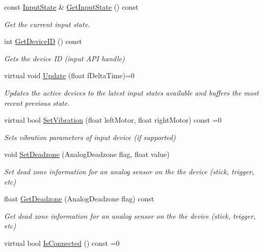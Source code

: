 \begin{DoxyCompactItemize}
const \hyperlink{struct_blade_1_1_input_state}{Input\+State} \& \hyperlink{class_blade_1_1_input_device_a0c652079b55274cf661ecf2657f65967}{Get\+Input\+State} () const
\begin{DoxyCompactList}\small\item\em Get the current input state. \end{DoxyCompactList}\item 
int \hyperlink{class_blade_1_1_input_device_af05aace5ac1decaa1bf64bfefbcf013b}{Get\+Device\+ID} () const
\begin{DoxyCompactList}\small\item\em Gets the device ID (input A\+PI handle) \end{DoxyCompactList}\item 
virtual void \hyperlink{class_blade_1_1_input_device_a6c0b653604f7c2a4840116c9e893b3e5}{Update} (float f\+Delta\+Time)=0
\begin{DoxyCompactList}\small\item\em Updates the active devices to the latest input states available and buffers the most recent previous state. \end{DoxyCompactList}\item 
virtual bool \hyperlink{class_blade_1_1_input_device_a49858a83478b83d04f95d746cc6a4b75}{Set\+Vibration} (float left\+Motor, float right\+Motor) const =0
\begin{DoxyCompactList}\small\item\em Sets vibration parameters of input device (if supported) \end{DoxyCompactList}\item 
void \hyperlink{class_blade_1_1_input_device_a6bb50d40148c2bd07d1b979c4fed8adb}{Set\+Deadzone} (Analog\+Deadzone flag, float value)
\begin{DoxyCompactList}\small\item\em Set dead zone information for an analog sensor on the the device (stick, trigger, etc) \end{DoxyCompactList}\item 
float \hyperlink{class_blade_1_1_input_device_ab851fc6f3f7f40a376804be9d66a748d}{Get\+Deadzone} (Analog\+Deadzone flag) const
\begin{DoxyCompactList}\small\item\em Get dead zone information for an analog sensor on the the device (stick, trigger, etc) \end{DoxyCompactList}\item 
virtual bool \hyperlink{class_blade_1_1_input_device_aa9cc6d93af07d3fb28db79f663752c4c}{Is\+Connected} () const =0

\end{DoxyCompactItemize}
